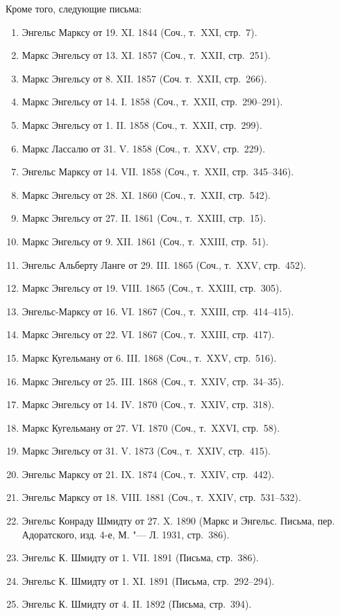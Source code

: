 {{Кроме того, следующие письма:
\begin{enumerate}
\item Энгельс Марксу от 19. XI. 1844 (Соч., т.~XXI, стр.~7).
\item Маркс Энгельсу от 13. XI. 1857 (Соч., т.~XXII, стр.~251).
\item Маркс Энгельсу от 8. XII. 1857 (Соч. т.~XXII, стр.~266).
\item Маркс Энгельсу от 14. I. 1858 (Соч., т.~XXII, стр.~290--291).
\item Маркс Энгельсу от 1. II. 1858 (Соч., т.~XXII, стр.~299).
\item Маркс Лассалю от 31. V. 1858 (Соч., т.~XXV, стр.~229).
\item Энгельс Марксу от 14. VII. 1858 (Соч., т.~XXII, стр.~345--346).
\item Маркс Энгельсу от 28. XI. 1860 (Соч., т.~XXII, стр.~542).
\item Маркс Энгельсу от 27. II. 1861 (Соч., т.~XXIII, стр.~15).
\item Маркс Энгельсу от 9. XII. 1861 (Соч., т.~XXIII, стр.~51).
\item Энгельс Альберту Ланге от 29. III. 1865 (Соч., т.~XXV, стр.~452).
\item Маркс Энгельсу от 19. VIII. 1865 (Соч., т.~XXIII, стр.~305).
\item Энгельс-Марксу от 16. VI. 1867 (Соч., т.~XXIII, стр.~414--415).
\item Маркс Энгельсу от 22. VI. 1867 (Соч., т.~XXIII, стр.~417).
\item Маркс Кугельману от 6. III. 1868 (Соч., т.~XXV, стр.~516).
\item Маркс Энгельсу от 25. III. 1868 (Соч., т.~XXIV, стр.~34--35).
\item Маркс Энгельсу от 14. IV. 1870 (Соч., т.~XXIV, стр.~318).
\item Маркс Кугельману от 27. VI. 1870 (Соч., т.~XXVI, стр.~58).
\item Маркс Энгельсу от 31. V. 1873 (Соч., т.~XXIV, стр.~415).
\item Энгельс Марксу от 21. IX. 1874 (Соч., т.~XXIV, стр.~442).
\item Энгельс Марксу от 18. VIII. 1881 (Соч., т.~XXIV, стр.~531--532).
\item Энгельс Конраду Шмидту от 27. X. 1890 (Маркс и Энгельс. Письма,
пер. Адоратского, изд. 4-е, М. "--- Л. 1931, стр.~386).
\item Энгельс К. Шмидту от 1. VII. 1891 (Письма, стр.~386).
\item Энгельс К. Шмидту от 1. XI. 1891 (Письма, стр.~292--294).
\item Энгельс К. Шмидту от 4. II. 1892 (Письма, стр.~394).
\end{enumerate}

}}
